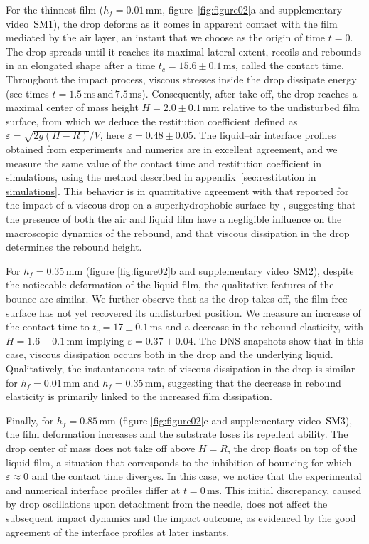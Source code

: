 \documentclass[]{jfm}
\newcommand*\red{\textcolor{black}}
\newcommand{\revRev}[1]{\textcolor{black}{#1}}
\begin{document}
	For the thinnest film ($h_f = 0.01\,\si{\milli\meter}$, figure~\ref{fig:figure02}a and supplementary video~\red{SM1}), the drop deforms as it comes in apparent contact with the film mediated by the air layer, an instant that we choose as the origin of time $t = 0$. The drop spreads until it reaches its maximal lateral extent, recoils and rebounds in an elongated shape after a time $t_c = 15.6 \pm 0.1\,\si{\milli\second}$, called the contact time. 
	Throughout the impact process, viscous stresses inside the drop dissipate energy (see times $t = 1.5\,\si{\milli\second}\,\text{and}\,7.5\,\si{\milli\second}$). Consequently, after take off, the drop reaches a maximal center of mass height $H = 2.0 \pm 0.1\,\si{\milli\meter}$ relative to the undisturbed film surface, from which we deduce the restitution coefficient defined as $\varepsilon = \sqrt{2g(H-R)}/V$, here $\varepsilon = 0.48\pm 0.05$. 
	The liquid--air interface profiles obtained from experiments and numerics are in excellent agreement, and we measure the same value of the contact time and restitution coefficient in simulations, using the method described in appendix~\ref{sec:restitution in simulations}. 
	This behavior is in quantitative agreement with that reported for the impact of a viscous drop on a superhydrophobic surface by \citet{jha2020viscous}, suggesting that the presence of both the air and liquid film have a negligible influence on the macroscopic dynamics of the rebound, and that viscous dissipation in the drop determines the rebound height.
	
	For $h_f = 0.35\,\si{\milli\meter}$ (figure \ref{fig:figure02}b and supplementary video~\red{SM2}), despite the noticeable deformation of the liquid film, the qualitative features of the bounce are similar. We further observe that as the drop takes off, the film free surface has not yet recovered its undisturbed position. We measure an increase of the contact time to $t_c = 17 \pm 0.1\,\si{\milli\second}$ and a decrease in the rebound elasticity, with $H = 1.6 \pm 0.1\,\si{\milli\meter}$ implying $\varepsilon = 0.37 \pm 0.04$.  The DNS snapshots show that in this case, viscous dissipation occurs both in the drop and the underlying liquid. Qualitatively, the instantaneous rate of viscous dissipation in the drop is similar for $h_f = 0.01\,\si{\milli\meter}$ and $h_f = 0.35\,\si{\milli\meter}$, suggesting that the decrease in rebound elasticity is primarily linked to the increased film dissipation.
	
	Finally, for $h_f = 0.85\,\si{\milli\meter}$ (figure \ref{fig:figure02}c and supplementary video~\red{SM3}), the film deformation increases and the substrate \revRev{loses} its repellent ability. The drop center of mass does not take off above $H=R$, the drop floats on top of the liquid film, a situation that corresponds to the inhibition of bouncing for which $\varepsilon \approx 0$ and the contact time diverges.
	In this case, we notice that the experimental and numerical interface profiles differ at $t= 0\,\si{\milli\second}$. This initial discrepancy, caused by drop oscillations upon detachment from the needle, does not affect the subsequent impact dynamics and the impact outcome, as evidenced by the good agreement of the interface profiles at later instants.
	
\end{document}
